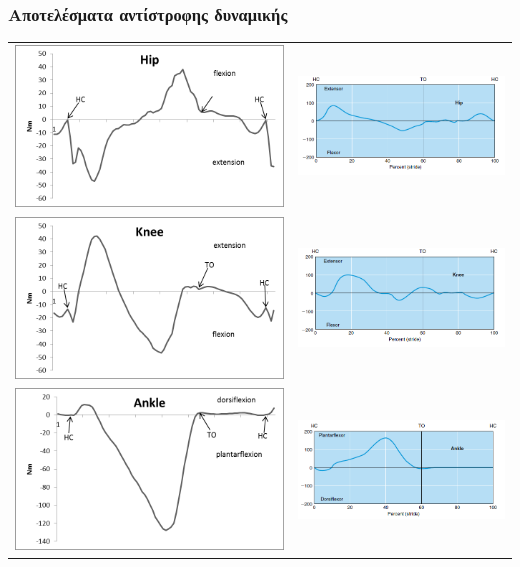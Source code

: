 \documentclass[8pt,sans,mathserif]{beamer}%
\begin{document}
\begin{frame}
\frametitle{Αποτελέσματα αντίστροφης δυναμικής}

    \begin{center}
        \begin{tabular}{cc}
            \includegraphics[width=.48\textwidth, height = 0.25\textheight, keepaspectratio]{fig/id-hip.png} & \includegraphics[width=.48\textwidth, height = 0.25\textheight, keepaspectratio]{fig/id-hip-ref.png}\\[3pt]
            \includegraphics[width=.48\textwidth, height = 0.25\textheight, keepaspectratio]{fig/id-knee.png} & \includegraphics[width=.48\textwidth, height = 0.25\textheight, keepaspectratio]{fig/id-knee-ref.png}\\[3pt]
            \includegraphics[width=.48\textwidth, height = 0.25\textheight, keepaspectratio]{fig/id-ankle.png} & \includegraphics[width=.48\textwidth, height = 0.25\textheight, keepaspectratio]{fig/id-ankle-ref.png}

\end{tabular}
\end{center}
\end{frame}
\end{document}
